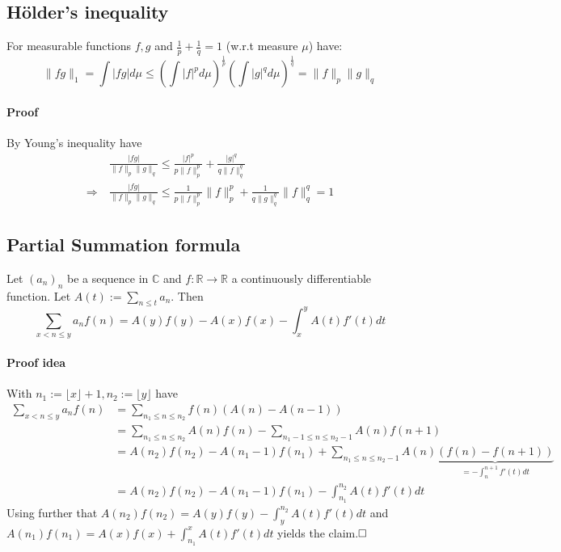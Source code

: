 \documentclass{scrartcl}
\newcommand{\R}{\mathbb{R}}
\newcommand{\C}{\mathbb{C}}
\begin{document}
\subsection{Hölder's inequality} 
For measurable functions $f, g$ and $\frac 1 p + \frac 1 q = 1$ (w.r.t measure $\mu$) have:
\label{hoelder_inequality}
\begin{equation}
    \| fg \|_1 = \int | fg | d\mu \leq \left( \int |f|^p d\mu \right)^{\frac 1 p} \left( \int |g|^q d\mu \right)^{\frac 1 q} = \|f\|_p \|g\|_q \nonumber
\end{equation}
\paragraph{Proof} By Young's inequality have
\begin{equation}
    \begin{split}
        &\frac {|fg|} {\| f \|_p \| g \|_q} \leq \frac {|f|^p} {p\|f\|_p^p} + \frac {|g|^q} {q\|f\|_q^q} \\
        \Rightarrow \ &\frac {|fg|} {\| f \|_p \| g \|_q} \leq \frac 1 {p \|f\|_p^p} \|f\|_p^p + \frac 1 {q \|g\|_q^q} \|f\|_q^q = 1 \nonumber
    \end{split}
\end{equation}

\subsection{Partial Summation formula}
Let $(a_n)_n$ be a sequence in $\C$ and $f: \R \to \R$ a continuously differentiable function.
Let $A(t) := \sum_{n \leq t} a_n$. Then
\begin{equation*}
    \sum_{x < n \leq y} a_n f(n) = A(y)f(y) - A(x)f(x) - \int_x^y A(t)f'(t)dt
\end{equation*}
\paragraph{Proof idea} With $n_1 := \lfloor x \rfloor + 1, n_2 := \lfloor y \rfloor$ have
\begin{align*}
    \sum_{x < n \leq y} a_n f(n) &= \sum_{n_1 \leq n \leq n_2} f(n)(A(n) - A(n - 1)) \\
    &= \sum_{n_1 \leq n \leq n_2} A(n) f(n) - \sum_{n_1 - 1 \leq n \leq n_2 - 1} A(n) f(n + 1) \\
    &= A(n_2) f(n_2) - A(n_1 - 1) f(n_1) + \sum_{n_1 \leq n \leq n_2 - 1} A(n) \underbrace{(f(n) - f(n + 1))}_{= -\int_n^{n+1} f'(t) dt} \\
    &= A(n_2) f(n_2) - A(n_1 - 1) f(n_1) - \int_{n_1}^{n_2} A(t) f'(t) dt
\end{align*}
Using further that $A(n_2) f(n_2) = A(y) f(y) - \int_y^{n_2} A(t) f'(t) dt$ and $A(n_1) f(n_1) = A(x) f(x) + \int_{n_1}^x A(t) f'(t) dt$ yields the claim.$\hfill\square$
\end{document}
